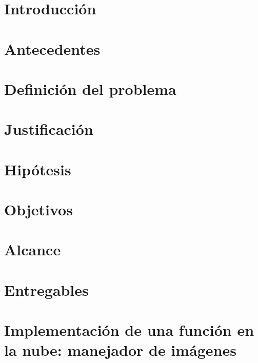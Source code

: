 \documentclass[12pt, twoside]{report}
\begin{document}
\tableofcontents
\listoffigures
\listoftables
\listofalgorithms

\printglossary[type=\acronymtype, title=Acrónimos]

\printglossaries

\chapter{Introducción}


\chapter{Antecedentes}
\label{cap:antecedentes}


\chapter{Definición del problema}
\label{cap:problema}


\chapter{Justificación}
\label{cap:justificacion}


\chapter{Hipótesis}
\label{cap:hipotesis}


\chapter{Objetivos}
\label{cap:objetivos}


\chapter{Alcance}
\label{cap:alcance}


\chapter{Entregables}
\label{cap:entregables}


\chapter[Implementación de una \emph{FaaS}: manejador de imágenes]{Implementación de una función en la nube: manejador de imágenes}
\label{cap:manejador-imagenes}

\end{document}
